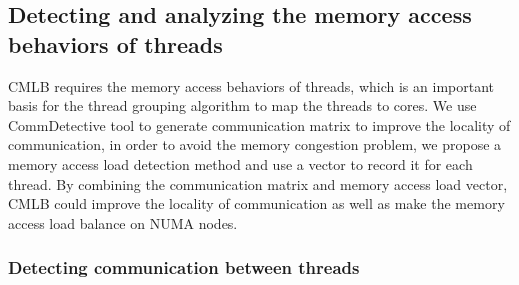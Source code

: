 \documentclass[a4paper,fleqn]{cas-sc}
\begin{document}
\subsection{Detecting and analyzing the memory access behaviors of threads}

CMLB requires the memory access behaviors of threads, which is an important basis for the thread grouping algorithm to map the threads to cores. We use CommDetective \cite{16} tool to generate communication matrix to improve the locality of communication, in order to avoid the memory congestion problem, we propose a memory access load detection method and use a vector to record it for each thread. By combining the communication matrix and memory access load vector, CMLB could improve the locality of communication as well as make the memory access load balance on NUMA nodes.

\subsubsection{Detecting communication between threads}
\end{document}
